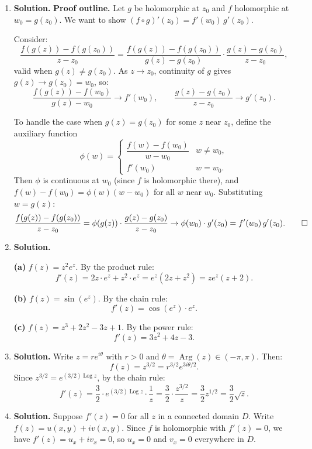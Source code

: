 \begin{enumerate}
\item \textbf{Solution.}
\textbf{Proof outline.} Let $g$ be holomorphic at $z_0$ and $f$ holomorphic at $w_0 = g(z_0)$. We want to show $(f \circ g)'(z_0) = f'(w_0)\,g'(z_0)$.

Consider:
\[
\frac{f(g(z)) - f(g(z_0))}{z - z_0} = \frac{f(g(z)) - f(g(z_0))}{g(z) - g(z_0)} \cdot \frac{g(z) - g(z_0)}{z - z_0},
\]
valid when $g(z) \neq g(z_0)$. As $z \to z_0$, continuity of $g$ gives $g(z) \to g(z_0) = w_0$, so:
\[
\frac{f(g(z)) - f(w_0)}{g(z) - w_0} \to f'(w_0), \qquad \frac{g(z) - g(z_0)}{z - z_0} \to g'(z_0).
\]

To handle the case when $g(z) = g(z_0)$ for some $z$ near $z_0$, define the auxiliary function
\[
\phi(w) = \begin{cases} \dfrac{f(w) - f(w_0)}{w - w_0} & w \neq w_0, \\[6pt] f'(w_0) & w = w_0. \end{cases}
\]
Then $\phi$ is continuous at $w_0$ (since $f$ is holomorphic there), and $f(w) - f(w_0) = \phi(w)(w - w_0)$ for all $w$ near $w_0$. Substituting $w = g(z)$:
\[
\frac{f(g(z)) - f(g(z_0))}{z - z_0} = \phi(g(z)) \cdot \frac{g(z) - g(z_0)}{z - z_0} \to \phi(w_0) \cdot g'(z_0) = f'(w_0)\,g'(z_0). \qed
\]

\item \textbf{Solution.}

\textbf{(a)} $f(z) = z^2 e^z$. By the product rule:
\[
f'(z) = 2z \cdot e^z + z^2 \cdot e^z = e^z(2z + z^2) = z e^z(z + 2).
\]

\textbf{(b)} $f(z) = \sin(e^z)$. By the chain rule:
\[
f'(z) = \cos(e^z) \cdot e^z.
\]

\textbf{(c)} $f(z) = z^3 + 2z^2 - 3z + 1$. By the power rule:
\[
f'(z) = 3z^2 + 4z - 3.
\]

\item \textbf{Solution.}
Write $z = re^{i\theta}$ with $r > 0$ and $\theta = \operatorname{Arg}(z) \in (-\pi, \pi)$. Then:
\[
f(z) = z^{3/2} = r^{3/2} e^{3i\theta/2}.
\]
Since $z^{3/2} = e^{(3/2)\operatorname{Log} z}$, by the chain rule:
\[
f'(z) = \frac{3}{2} \cdot e^{(3/2)\operatorname{Log} z} \cdot \frac{1}{z} = \frac{3}{2} \cdot \frac{z^{3/2}}{z} = \frac{3}{2} z^{1/2} = \frac{3}{2}\sqrt{z}.
\]

\item \textbf{Solution.}
Suppose $f'(z) = 0$ for all $z$ in a connected domain $D$. Write $f(z) = u(x,y) + iv(x,y)$. Since $f$ is holomorphic with $f'(z) = 0$, we have $f'(z) = u_x + iv_x = 0$, so $u_x = 0$ and $v_x = 0$ everywhere in $D$.


\end{enumerate}
